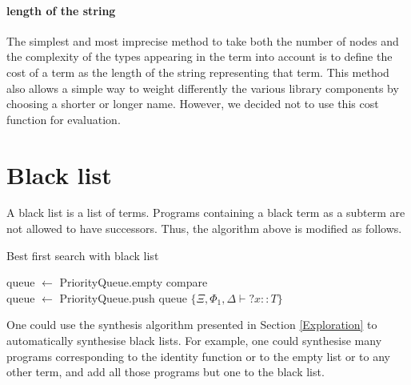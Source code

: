   \paragraph{length of the string}
The simplest and most imprecise method to take both the number of nodes and the complexity of the types appearing in the term into account is to define the cost of a term as the length of the string representing that term. This method also allows a simple way to weight differently the various library components by choosing a shorter or longer name. However, we decided not to use this cost function for evaluation.

\section{Black list}\label{Black list}
A black list is a list of terms. Programs containing a black term as a subterm are not allowed to have successors. Thus, the algorithm above is modified as follows.

\begin{algorithm}
\caption{Best first search with black list}

queue $\gets$ PriorityQueue.empty compare\\
queue $\gets$ PriorityQueue.push queue $\{\Xi, \Phi_1, \Delta \vdash {?x} :: T\}$\\

\end{algorithm}

One could use the synthesis algorithm presented in Section \ref{Exploration} to automatically synthesise black lists. For example,  one could synthesise many programs corresponding to the identity function or to the empty list or to any other term, and add all those programs but one to the black list.

